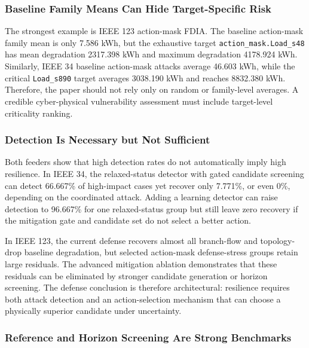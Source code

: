 \subsubsection{Baseline Family Means Can Hide Target-Specific Risk}
\label{subsubsec:baseline_vs_criticality}

The strongest example is IEEE 123 action-mask FDIA. The baseline action-mask family mean is only 7.586 kWh, but the exhaustive target \texttt{action\_mask.Load\_s48} has mean degradation 2317.398 kWh and maximum degradation 4178.924 kWh. Similarly, IEEE 34 baseline action-mask attacks average 46.603 kWh, while the critical \texttt{Load\_s890} target averages 3038.190 kWh and reaches 8832.380 kWh. Therefore, the paper should not rely only on random or family-level averages. A credible cyber-physical vulnerability assessment must include target-level criticality ranking.

\subsubsection{Detection Is Necessary but Not Sufficient}
\label{subsubsec:detection_not_sufficient}

Both feeders show that high detection rates do not automatically imply high resilience. In IEEE 34, the relaxed-status detector with gated candidate screening can detect 66.667\% of high-impact cases yet recover only 7.771\%, or even 0\%, depending on the coordinated attack. Adding a learning detector can raise detection to 96.667\% for one relaxed-status group but still leave zero recovery if the mitigation gate and candidate set do not select a better action.

In IEEE 123, the current defense recovers almost all branch-flow and topology-drop baseline degradation, but selected action-mask defense-stress groups retain large residuals. The advanced mitigation ablation demonstrates that these residuals can be eliminated by stronger candidate generation or horizon screening. The defense conclusion is therefore architectural: resilience requires both attack detection and an action-selection mechanism that can choose a physically superior candidate under uncertainty.

\subsubsection{Reference and Horizon Screening Are Strong Benchmarks}
\label{subsubsec:reference_horizon_screening}

